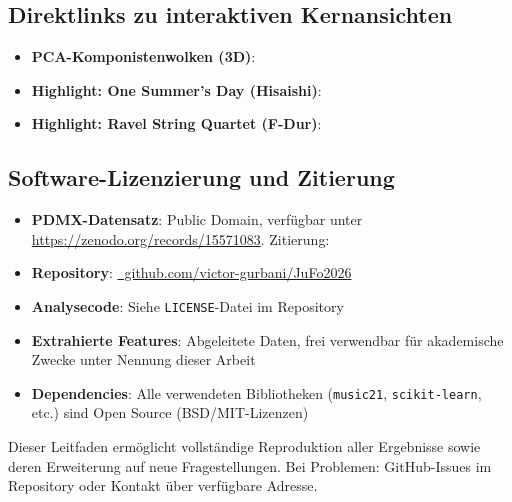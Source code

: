 \documentclass[12pt,a4paper]{article}
\theoremstyle{definition}
\begin{document}
\subsection{Direktlinks zu interaktiven Kernansichten}
\begin{itemize}
    \item \textbf{PCA-Komponistenwolken (3D)}: \newline{}
    \item \textbf{Highlight: One Summer's Day (Hisaishi)}: \newline{}
    \item \textbf{Highlight: Ravel String Quartet (F-Dur)}: \newline{}
\end{itemize}

\subsection{Software-Lizenzierung und Zitierung}

\begin{itemize}
    \item \textbf{PDMX-Datensatz}: Public Domain, verfügbar unter \url{https://zenodo.org/records/15571083}. Zitierung: \cite{PDMX2024}
    \item \textbf{Repository}: \href{https://github.com/victor-gurbani/JuFo2026/}{\faGithub\ github.com/victor-gurbani/JuFo2026}
    \item \textbf{Analysecode}: Siehe \texttt{LICENSE}-Datei im Repository
    \item \textbf{Extrahierte Features}: Abgeleitete Daten, frei verwendbar für akademische Zwecke unter Nennung dieser Arbeit
    \item \textbf{Dependencies}: Alle verwendeten Bibliotheken (\texttt{music21}, \texttt{scikit-learn}, etc.) sind Open Source (BSD/MIT-Lizenzen)
\end{itemize}

Dieser Leitfaden ermöglicht vollständige Reproduktion aller Ergebnisse sowie deren Erweiterung auf neue Fragestellungen. Bei Problemen: GitHub-Issues im Repository oder Kontakt über verfügbare Adresse.
\end{document}
